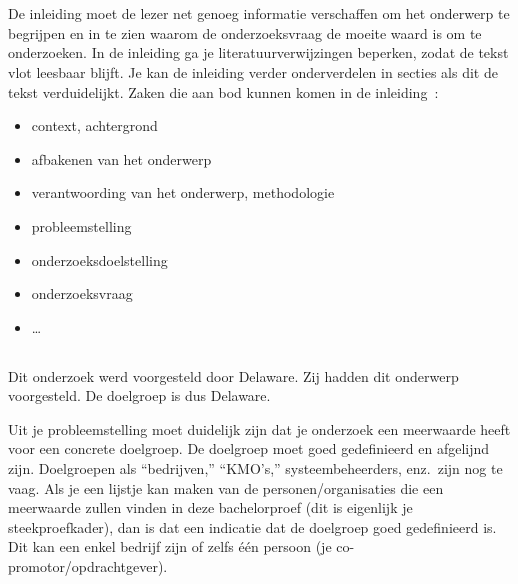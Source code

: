 
\chapter{}
\label{ch:inleiding}

De inleiding moet de lezer net genoeg informatie verschaffen om het onderwerp te begrijpen en in te zien waarom de onderzoeksvraag de moeite waard is om te onderzoeken. In de inleiding ga je literatuurverwijzingen beperken, zodat de tekst vlot leesbaar blijft. Je kan de inleiding verder onderverdelen in secties als dit de tekst verduidelijkt. Zaken die aan bod kunnen komen in de inleiding~\autocite{Pollefliet2011}:

\begin{itemize}
  \item context, achtergrond
  \item afbakenen van het onderwerp
  \item verantwoording van het onderwerp, methodologie
  \item probleemstelling
  \item onderzoeksdoelstelling
  \item onderzoeksvraag
  \item \ldots
\end{itemize}

\section{}
\label{sec:probleemstelling}
Dit onderzoek werd voorgesteld door Delaware. Zij hadden dit onderwerp voorgesteld. De doelgroep is dus Delaware.

Uit je probleemstelling moet duidelijk zijn dat je onderzoek een meerwaarde heeft voor een concrete doelgroep. De doelgroep moet goed gedefinieerd en afgelijnd zijn. Doelgroepen als ``bedrijven,'' ``KMO's,'' systeembeheerders, enz.~zijn nog te vaag. Als je een lijstje kan maken van de personen/organisaties die een meerwaarde zullen vinden in deze bachelorproef (dit is eigenlijk je steekproefkader), dan is dat een indicatie dat de doelgroep goed gedefinieerd is. Dit kan een enkel bedrijf zijn of zelfs één persoon (je co-promotor/opdrachtgever).

